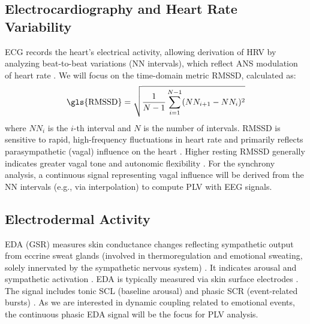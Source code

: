 \documentclass[12pt]{article} %
\begin{document}
\subsection{Electrocardiography and Heart Rate Variability}
\gls{ECG} records the heart's electrical activity, allowing derivation of \gls{HRV} by analyzing beat-to-beat variations (\gls{NN intervals}), which reflect \gls{ANS} modulation of heart rate \parencite{malikHeartRateVariability1996, berntsonHeartRateVariability1997}. We will focus on the time-domain metric \gls{RMSSD}, calculated as:
\begin{equation}
    \text{\gls{RMSSD}} = \sqrt{\frac{1}{N-1} \sum_{i=1}^{N-1} (NN_{i+1} - NN_i)^2}
    \label{eq:rmssd} %
\end{equation}
where $NN_i$ is the $i$-th interval and $N$ is the number of intervals. \gls{RMSSD} is sensitive to rapid, high-frequency fluctuations in heart rate and primarily reflects parasympathetic (vagal) influence on the heart \parencite{malikHeartRateVariability1996, shafferOverviewHeartRate2017}. Higher resting \gls{RMSSD} generally indicates greater vagal tone and autonomic flexibility \parencite{thayerRelationshipAutonomicImbalance2010}. For the synchrony analysis, a continuous signal representing vagal influence will be derived from the \gls{NN intervals} (e.g., via interpolation) to compute \gls{PLV} with \gls{EEG} signals.

\subsection{Electrodermal Activity}
\gls{EDA} (\gls{GSR}) measures skin conductance changes reflecting sympathetic output from eccrine sweat glands (involved in thermoregulation and emotional sweating, solely innervated by the sympathetic nervous system) \parencite{dawsonElectrodermalSystem2007, boucseinElectrodermalActivity2012}. It indicates arousal and sympathetic activation \parencite{kreibigAutonomicNervousSystem2010}. \gls{EDA} is typically measured via skin surface electrodes \parencite{boucseinElectrodermalActivity2012}. The signal includes tonic \gls{SCL} (baseline arousal) and phasic \gls{SCR} (event-related bursts) \parencite{dawsonElectrodermalSystem2007}. As we are interested in dynamic coupling related to emotional events, the continuous phasic \gls{EDA} signal will be the focus for \gls{PLV} analysis.
\end{document}
